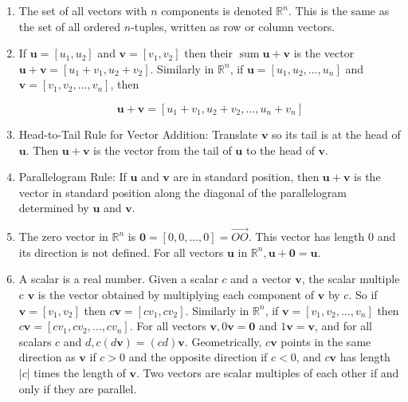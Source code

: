\documentclass[10pt]{article}
\begin{document}
\begin{enumerate}
\item  The set of all vectors with $n$ components is denoted $\mathbb{R}^{n}$. This is the same as the set of all ordered $n$-tuples, written as row or column vectors.

\item  If $\mathbf{u}=\left[u_{1}, u_{2}\right]$ and $\mathbf{v}=\left[v_{1}, v_{2}\right]$ then their $\operatorname{sum} \mathbf{u}+\mathbf{v}$ is the vector $\mathbf{u}+\mathbf{v}=\left[u_{1}+v_{1}, u_{2}+v_{2}\right]$. Similarly in $\mathbb{R}^{n}$, if $\mathbf{u}=\left[u_{1}, u_{2}, \ldots, u_{n}\right]$ and $\mathbf{v}=\left[v_{1}, v_{2}, \ldots, v_{n}\right]$, then

$$
\mathbf{u}+\mathbf{v}=\left[u_{1}+v_{1}, u_{2}+v_{2}, \ldots, u_{n}+v_{n}\right]
$$

\item Head-to-Tail Rule for Vector Addition: Translate $\mathbf{v}$ so its tail is at the head of $\mathbf{u}$. Then $\mathbf{u}+\mathbf{v}$ is the vector from the tail of $\mathbf{u}$ to the head of $\mathbf{v}$.

\item Parallelogram Rule: If $\mathbf{u}$ and $\mathbf{v}$ are in standard position, then $\mathbf{u}+\mathbf{v}$ is the vector in standard position along the diagonal of the parallelogram determined by $\mathbf{u}$ and $\mathbf{v}$.

\item The zero vector in $\mathbb{R}^{n}$ is $\mathbf{0}=[0,0, \ldots, 0]=\overrightarrow{O O}$. This vector has length 0 and its direction is not defined. For all vectors $\mathbf{u}$ in $\mathbb{R}^{n}, \mathbf{u}+\mathbf{0}=\mathbf{u}$.

\item A scalar is a real number. Given a scalar $c$ and a vector $\mathbf{v}$, the scalar multiple c $\mathbf{v}$ is the vector obtained by multiplying each component of $\mathbf{v}$ by $c$. So if $\mathbf{v}=\left[v_{1}, v_{2}\right]$ then $c \mathbf{v}=\left[c v_{1}, c v_{2}\right]$. Similarly in $\mathbb{R}^{n}$, if $\mathbf{v}=\left[v_{1}, v_{2}, \ldots, v_{n}\right]$ then $c \mathbf{v}=\left[c v_{1}, c v_{2}, \ldots, c v_{n}\right]$. For all vectors $\mathbf{v}, 0 \mathbf{v}=\mathbf{0}$ and $1 \mathbf{v}=\mathbf{v}$, and for all scalars $c$ and $d, c(d \mathbf{v})=(c d) \mathbf{v}$. Geometrically, $c \mathbf{v}$ points in the same direction as $\mathbf{v}$ if $c>0$ and the opposite direction if $c<0$, and $c \mathbf{v}$ has length $|c|$ times the length of $\mathbf{v}$. Two vectors are scalar multiples of each other if and only if they are parallel.


\end{enumerate}
\end{document}
